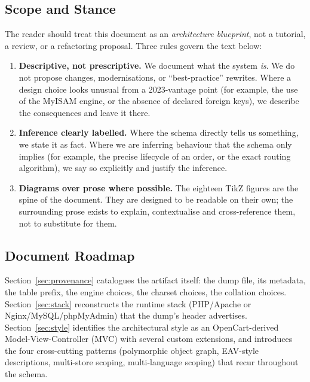 \documentclass[11pt,a4paper]{article}
\begin{document}
\subsection{Scope and Stance}

The reader should treat this document as an \emph{architecture blueprint},
not a tutorial, a review, or a refactoring proposal. Three rules govern the
text below:

\begin{enumerate}[leftmargin=1.6em,itemsep=2pt]
  \item \textbf{Descriptive, not prescriptive.} We document what the system
        \emph{is}. We do not propose changes, modernisations, or ``best-practice''
        rewrites. Where a design choice looks unusual from a 2023-vantage
        point (for example, the use of the MyISAM engine, or the absence of
        declared foreign keys), we describe the consequences and leave it
        there.
  \item \textbf{Inference clearly labelled.} Where the schema directly tells
        us something, we state it as fact. Where we are inferring behaviour
        that the schema only implies (for example, the precise lifecycle of
        an order, or the exact routing algorithm), we say so explicitly and
        justify the inference.
  \item \textbf{Diagrams over prose where possible.} The eighteen TikZ figures
        are the spine of the document. They are designed to be readable on
        their own; the surrounding prose exists to explain, contextualise and
        cross-reference them, not to substitute for them.
\end{enumerate}

\subsection{Document Roadmap}

Section~\ref{sec:provenance} catalogues the artifact itself: the dump file,
its metadata, the table prefix, the engine choices, the charset choices, the
collation choices. Section~\ref{sec:stack} reconstructs the runtime stack
(PHP/Apache or Nginx/MySQL/phpMyAdmin) that the dump's header advertises.
Section~\ref{sec:style} identifies the architectural style as an
OpenCart-derived Model-View-Controller (MVC) with several custom extensions,
and introduces the four cross-cutting patterns (polymorphic object graph,
EAV-style descriptions, multi-store scoping, multi-language scoping) that
recur throughout the schema.
\end{document}
